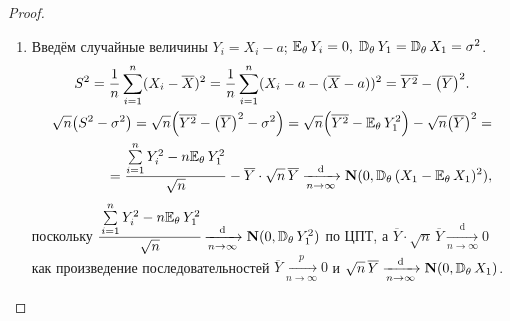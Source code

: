 \begin{proof}
\begin{enumerate}
    \item Введём случайные величины $Y_{i}=X_{i}-a$; $\mathbb{E}_{\theta}\, Y_{i} = 0, \; \mathbb{D}_{\theta}\, Y_{1} = \mathbb{D}_{\theta}\, X_{1}=\sigma^{2}$.
    \begin{gather*}
        S^{2}=\frac{1}{n} \sum\limits_{i=1}^{n}(X_{i}-\overline{X})^{2}=\frac{1}{n} \sum\limits_{i=1}^{n}(X_{i}-a-(\overline{X}-a))^{2}=\overline{Y^{2}}-\bigl(\overline{Y}\bigr)^{2}. \\
        \begin{aligned}
            \sqrt{n}\bigl(S^{2}-\sigma^{2}\bigr) = \sqrt{n}\Bigl(\overline{Y^{2}}-\bigl(\overline{Y}\bigr)^{2}-\sigma^{2}\Bigr)
            = \sqrt{n}\Bigl(\overline{Y^{2}}-\mathbb{E}_{\theta}\,  Y_{1}^{2} \Bigr) - \sqrt{n}\bigl(\overline{Y}\bigr)^{2} = \\
            =\frac{\sum\limits_{i=1}^{n} Y_{i}^{2}-n \mathbb{E}_{\theta}\,  Y_{1}^{2}}{\sqrt{n}}-\overline{Y} \cdot \sqrt{n} \, \overline{Y} \xrightarrow[n \to \infty]{\text{d}} \mathbf{N}(0, \mathbb{D}_{\theta}\, (X_{1}-\mathbb{E}_{\theta}\, X_1)^{2}),
    \end{aligned}
    \end{gather*}
    поскольку $\cfrac{\sum\limits_{i=1}^{n} Y_{i}^{2}-n \mathbb{E}_{\theta}\,  Y_{1}^{2}}{\sqrt{n}} \xrightarrow[n \to \infty]{\text{d}} \mathbf{N}(0, \mathbb{D}_{\theta}\,  Y_{1}^{2})$ по ЦПТ, 
    а ${\overline{Y} \cdot \sqrt{n} \, \overline{Y} \xrightarrow[n \to \infty]{\text{d}} 0}$ как произведение последовательностей ${\overline{Y} \xrightarrow[n \rightarrow \infty]{p} 0}$ и ${\sqrt{n} \, \overline{Y} \xrightarrow[n \to \infty]{\text{d}} \mathbf{N}(0, \mathbb{D}_{\theta}\,  X_{1})}$.
\end{enumerate}
\end{proof}

